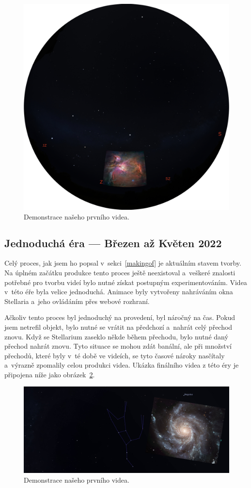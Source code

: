 \documentclass[12pt,a4paper,titlepage]{article}
\begin{document}
\begin{figure}[ht]
	\centering
	\includegraphics[width=.7\textwidth]{prosinec.eps}
	\caption{Demonstrace našeho prvního videa.}\label{img:prosinec}
\end{figure}
\subsection{Jednoduchá éra --- Březen až Květen 2022}
Celý proces, jak jsem ho popsal v~sekci~\ref{makingof} je aktuálním stavem tvorby. Na úplném začátku produkce tento proces ještě neexistoval a~veškeré znalosti potřebné pro tvorbu  videí bylo nutné získat postupným experimentováním. Videa v~této éře byla velice jednoduchá. Animace byly vytvořeny nahráváním okna Stellaria a~jeho ovládáním přes webové rozhraní.

Ačkoliv tento proces byl jednoduchý na provedení, byl náročný na čas. Pokud jsem netrefil objekt, bylo nutné se vrátit na předchozí a~nahrát celý přechod znovu. Když se Stellarium zaseklo někde během přechodu, bylo nutné daný přechod nahrát znovu. Tyto situace se mohou zdát banální, ale při množství přechodů, které byly v~té době ve videích, se tyto časové nároky nasčítaly a~výrazně zpomalily celou produkci videa. Ukázka finálního videa z této éry je připojena níže jako obrázek~\ref{img:brezen}.

\begin{figure}[ht]
	\centering
	\includegraphics[width=.85\textwidth]{brezen.png}
	\caption{Demonstrace našeho prvního videa.}\label{img:brezen}
\end{figure}
\end{document}
